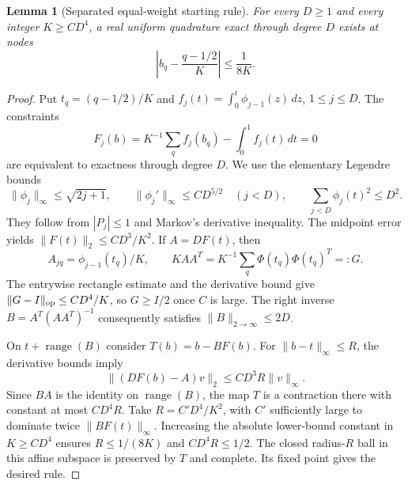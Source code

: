 \documentclass[11pt]{article}
\newtheorem{lemma}{Lemma}
\begin{document}
\begin{lemma}[Separated equal-weight starting rule]\label{grid}
For every $D\ge1$ and every integer $K\ge C D^4$, a real uniform
quadrature exact through degree $D$ exists at nodes
\[
 \left|b_q-\frac{q-1/2}{K}\right|\le\frac1{8K}.
\]
\end{lemma}
\begin{proof}
Put $t_q=(q-1/2)/K$ and
$f_j(t)=\int_0^t\phi_{j-1}(z)\,dz$, $1\le j\le D$.
The constraints
\[
 F_j(b)=K^{-1}\sum_q f_j(b_q)-\int_0^1 f_j(t)\,dt=0
\]
are equivalent to exactness through degree $D$.
We use the elementary Legendre bounds
\[
 \|\phi_j\|_\infty\le\sqrt{2j+1},\qquad
 \|\phi_j'\|_\infty\le C D^{5/2}\quad(j<D),
 \qquad \sum_{j<D}\phi_j(t)^2\le D^2.
\]
They follow from $|P_j|\le1$ and Markov's derivative inequality.
The midpoint error yields $\|F(t)\|_2\le C D^3/K^2$.
If $A=DF(t)$, then
\[
 A_{jq}=\phi_{j-1}(t_q)/K,\qquad
 KAA^T=K^{-1}\sum_q\Phi(t_q)\Phi(t_q)^T=:G.
\]
The entrywise rectangle estimate and the derivative bound give
$\|G-I\|_{\rm op}\le C D^4/K$, so $G\ge I/2$ once $C$ is large.
The right inverse $B=A^T(AA^T)^{-1}$ consequently satisfies
$\|B\|_{2\to\infty}\le2D$.

On $t+\operatorname{range}(B)$ consider $T(b)=b-BF(b)$.
For $\|b-t\|_\infty\le R$, the derivative bounds imply
\[
 \|(DF(b)-A)v\|_2\le C D^3 R\|v\|_\infty.
\]
Since $BA$ is the identity on $\operatorname{range}(B)$, the map
$T$ is a contraction there with constant at most $C D^4R$.
Take $R=C' D^4/K^2$, with $C'$ sufficiently large to dominate twice
$\|BF(t)\|_\infty$. Increasing the absolute lower-bound constant in
$K\ge CD^4$ ensures $R\le1/(8K)$ and $CD^4R\le1/2$.
The closed radius-$R$ ball in this affine subspace is preserved by
$T$ and complete. Its fixed point gives the desired rule.
\end{proof}
\end{document}

